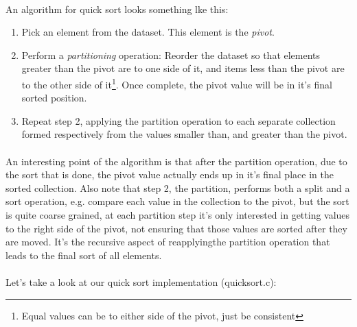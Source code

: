 \documentclass[10pt, a4paper, twosize]{article}
\begin{document}
\paragraph{} An algorithm for quick sort looks something lke this:

\begin{enumerate}
\item Pick an element from the dataset. This element is the \emph{pivot}.
\item Perform a \emph{partitioning} operation: Reorder the dataset so that elements greater than the pivot are to one side of it, and items less than the pivot are to the other side of it\footnote{Equal values can be to either side of the pivot, just be consistent}. Once complete, the pivot value will be in it's final sorted position.
\item Repeat step 2, applying the partition operation to each separate collection formed respectively from the values smaller than, and greater than the pivot.
\end{enumerate}

\paragraph{} An interesting point of the algorithm is that after the partition operation, due to the sort that is done, the pivot value actually ends up in it's final place in the sorted collection. Also note that step 2, the partition, performs both a split and a sort operation, e.g. compare each value in the collection to the pivot, but the sort is quite coarse grained, at each partition step it's only interested in getting values to the right side of the pivot, not ensuring that those values are sorted after they are moved. It's the recursive aspect of reapplyingthe partition operation that leads to the final sort of all elements.

\paragraph{} Let's take a look at our quick sort implementation (quicksort.c):
\end{document}
